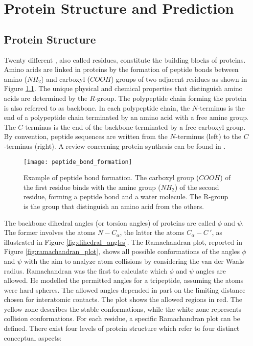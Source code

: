 
\chapter{Protein Structure and Prediction}
\label{chap:protein_structure_and_prediction}

\section{Protein Structure}
\label{sec:protein_structure}
Twenty different , also called residues, constitute the building blocks of proteins. Amino acids are linked in proteins by the formation of peptide bonds between amino ($NH_2$) and carboxyl ($COOH$) groups of two adjacent residues as shown in Figure \ref{fig:peptide_bond_formation}. The unique physical and chemical properties that distinguish amino acids are determined by the $R$-group. The polypeptide chain forming the protein is also referred to as backbone. In each polypeptide chain, the $N$-terminus is the end of a polypeptide chain terminated by an amino acid with a free amine group. The $C$-terminus is the end of the backbone terminated by a free carboxyl group. By convention, peptide sequences are written from the $N$-terminus (left) to the $C$-terminus (right). A review concerning protein synthesis can be found in \cite{Lengyel1969}.
\begin{figure}[tb]
	\begin{center}
		\texttt{[image: peptide\_bond\_formation]}
		\caption[Peptide bond formation]{Example of peptide bond formation. The carboxyl group ($COOH$) of the first residue binds with the amine group ($NH_2$) of the second residue, forming a peptide bond and a water molecule. The R-group is the group that distinguish an amino acid from the others.}
		\label{fig:peptide_bond_formation}
	\end{center}
\end{figure}
The backbone dihedral angles (or torsion angles) of proteins are called $\phi$ and $\psi$. The former involves the atoms $N-C_\alpha$, the latter the atoms $C_\alpha-C\ '$, as illustrated in Figure \ref{fig:dihedral_angles}. The Ramachandran plot, reported in Figure \ref{fig:ramachandran_plot}, shows all possible conformations of the angles $\phi$ and $\psi$ with the aim to analyze atom collisions by considering the van der Waals radius. Ramachandran \cite{Ramachandran1963} was the first to calculate which $\phi$ and $\psi$ angles are allowed. He modelled the permitted angles for a tripeptide, assuming the atoms were hard spheres. The allowed angles depended in part on the limiting distance chosen for interatomic contacts. The plot shows the allowed regions in red. The yellow zone describes the stable conformations, while the white zone represents collision conformations. For each residue, a specific Ramachandran plot can be defined.
There exist four levels of protein structure which refer to four distinct conceptual aspects:\\

